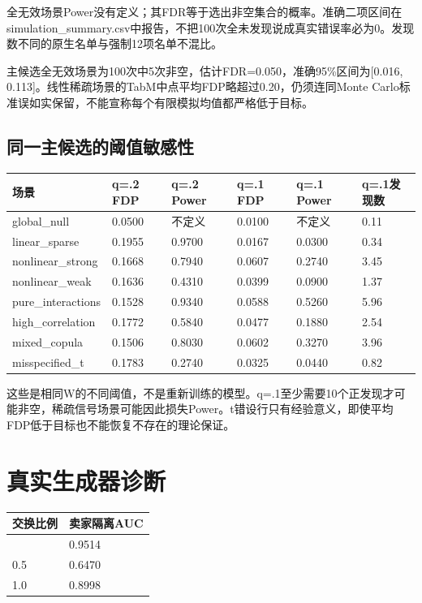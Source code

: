\documentclass[UTF8,11pt,a4paper]{ctexart}
\begin{document}
全无效场景Power没有定义；其FDR等于选出非空集合的概率。准确二项区间在simulation\_summary.csv中报告，不把100次全未发现说成真实错误率必为0。发现数不同的原生名单与强制12项名单不混比。

主候选全无效场景为100次中5次非空，估计FDR=0.050，准确95\%区间为{[}0.016, 0.113{]}。线性稀疏场景的TabM中点平均FDP略超过0.20，仍须连同Monte Carlo标准误如实保留，不能宣称每个有限模拟均值都严格低于目标。

\subsection{同一主候选的阈值敏感性}\label{ux540cux4e00ux4e3bux5019ux9009ux7684ux9608ux503cux654fux611fux6027}

{\def\LTcaptype{none} %
{
\footnotesize
\begin{longtable}[]{@{}llllll@{}}
\toprule\noalign{}
场景 & q=.2 FDP & q=.2 Power & q=.1 FDP & q=.1 Power & q=.1发现数 \\
\midrule\noalign{}
\endhead
\bottomrule\noalign{}
\endlastfoot
global\_null & 0.0500 & 不定义 & 0.0100 & 不定义 & 0.11 \\
linear\_sparse & 0.1955 & 0.9700 & 0.0167 & 0.0300 & 0.34 \\
nonlinear\_strong & 0.1668 & 0.7940 & 0.0607 & 0.2740 & 3.45 \\
nonlinear\_weak & 0.1636 & 0.4310 & 0.0399 & 0.0900 & 1.37 \\
pure\_interactions & 0.1528 & 0.9340 & 0.0588 & 0.5260 & 5.96 \\
high\_correlation & 0.1772 & 0.5840 & 0.0477 & 0.1880 & 2.54 \\
mixed\_copula & 0.1506 & 0.8030 & 0.0602 & 0.3270 & 3.96 \\
misspecified\_t & 0.1783 & 0.2740 & 0.0325 & 0.0440 & 0.82 \\
\end{longtable}
}
}

这些是相同W的不同阈值，不是重新训练的模型。q=.1至少需要10个正发现才可能非空，稀疏信号场景可能因此损失Power。t错设行只有经验意义，即使平均FDP低于目标也不能恢复不存在的理论保证。

\section{真实生成器诊断}\label{ux771fux5b9eux751fux6210ux5668ux8bcaux65ad}

{\def\LTcaptype{none} %
{
\footnotesize
\begin{longtable}[]{@{}ll@{}}
\toprule\noalign{}
交换比例 & 卖家隔离AUC \\
\midrule\noalign{}
\endhead
\bottomrule\noalign{}
\endlastfoot
0.25 & 0.9514 \\
0.5 & 0.6470 \\
1.0 & 0.8998 \\
\end{longtable}
}
}
\end{document}
